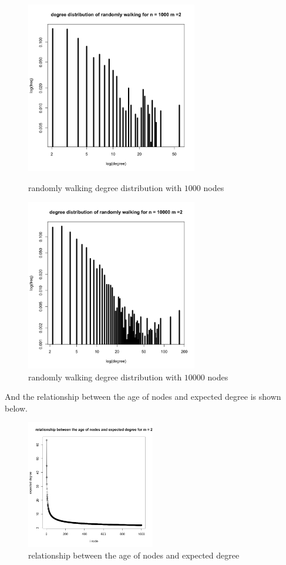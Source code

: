 \documentclass[draftcls,12pt,onecolumn]{IEEEtran}
\begin{document}
\begin{figure}[htbp]
\centering
\begin{minipage}[t]{0.48\textwidth}
\centering
\includegraphics[width=7.5cm]{img/2_g_1_degree3}
\caption{randomly walking degree distribution with $1000$ nodes}
\end{minipage}
\begin{minipage}[t]{0.48\textwidth}
\centering
\includegraphics[width=7.5cm]{img/2_g_1_degree4}
\caption{randomly walking degree distribution with $10000$ nodes}
\end{minipage}
\end{figure}

And the relationship between the age of nodes and expected degree is shown below.
\begin{figure}[H]
\centering
\includegraphics[width=0.5\textwidth]{img/2_g_1_relat}
\caption{relationship between the age of nodes and expected degree}
\end{figure}
\end{document}
